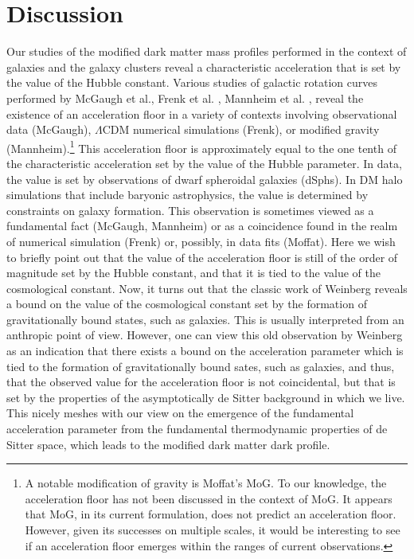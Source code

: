 \documentclass{bjp}
\begin{document}
\section{Discussion}
Our studies of the modified dark matter mass profiles performed in the context of galaxies and the galaxy clusters reveal a characteristic acceleration that is set by the value of the Hubble constant. 
Various studies of galactic rotation curves performed by McGaugh et al.\cite{Lelli:2017vgz}, %
Frenk et al. \cite{Ludlow:2016qzh}, %
Mannheim et al. \cite{OBrien:2017bwr}, %
reveal the existence of an acceleration floor in a variety of contexts involving observational data (McGaugh), $\Lambda$CDM numerical simulations (Frenk), or modified gravity (Mannheim).\footnote{A notable modification of gravity is Moffat's MoG\cite{Moffat:2013, Moffat:2014}. To our knowledge, the acceleration floor has not been discussed in the context of MoG. It appears that MoG, in its current formulation, does not predict an acceleration floor. However, given its successes on multiple scales, it would be interesting to see if an acceleration floor emerges within the ranges of current observations.}
This acceleration floor is approximately equal to the one tenth of the characteristic acceleration set by the value of the Hubble parameter. In data, the value is set by observations of dwarf spheroidal galaxies (dSphs)\cite{Lelli:2017vgz}. In DM halo simulations that include baryonic astrophysics, the value is determined by constraints on galaxy formation.\cite{Navarro:2016bfs}
This observation is sometimes viewed as a fundamental fact (McGaugh, Mannheim) or as a coincidence found in the realm of numerical simulation (Frenk) or, possibly, in data fits (Moffat).
Here we wish to briefly point out that the value of the acceleration floor is still of the order of magnitude set by the Hubble constant, and that it is tied to the value of the cosmological constant.
Now, it turns out that the classic work of Weinberg\cite{Weinberg:1987dv} reveals a bound on the value of the cosmological constant set by the formation of gravitationally bound states, such as galaxies.
This is usually interpreted from an anthropic point of view.
However, one can view this old observation by Weinberg as an indication that there exists a bound on the acceleration parameter which is tied to the formation of gravitationally bound sates, such as galaxies, and thus, that the observed value for the acceleration floor is not coincidental, but that is set by the properties of the asymptotically de Sitter background in which we live.
This nicely meshes with our view on the emergence of the fundamental acceleration parameter from the fundamental thermodynamic properties of de Sitter space, which leads to the modified dark matter dark profile.
\end{document}
